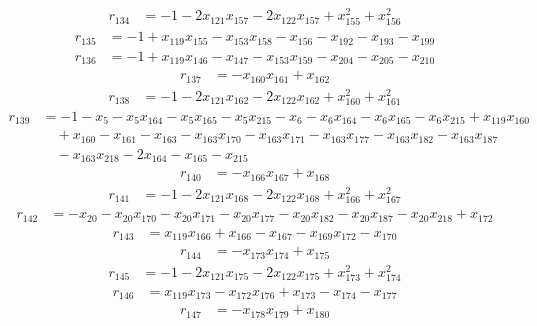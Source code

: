 \begin{align*}
r_{134}&=
-1-2x_{121}x_{157}-2x_{122}x_{157}+x_{155}^{2}+x_{156}^{2}
\end{align*}
\begin{align*}
r_{135}&=
-1+x_{119}x_{155}-x_{153}x_{158}-x_{156}-x_{192}-x_{193}-x_{199}
\end{align*}
\begin{align*}
r_{136}&=
-1+x_{119}x_{146}-x_{147}-x_{153}x_{159}-x_{204}-x_{205}-x_{210}
\end{align*}
\begin{align*}
r_{137}&=
-x_{160}x_{161}+x_{162}
\end{align*}
\begin{align*}
r_{138}&=
-1-2x_{121}x_{162}-2x_{122}x_{162}+x_{160}^{2}+x_{161}^{2}
\end{align*}
\begin{align*}
r_{139}&=
-1-x_{5}-x_{5}x_{164}-x_{5}x_{165}-x_{5}x_{215}-x_{6}-x_{6}x_{164}-x_{6}x_{165}-x_{6}x_{215}+x_{119}x_{160} \\
&\quad +x_{160}-x_{161}-x_{163}-x_{163}x_{170}-x_{163}x_{171}-x_{163}x_{177}-x_{163}x_{182}-x_{163}x_{187} \\
&\quad -x_{163}x_{218}-2x_{164}-x_{165}-x_{215}
\end{align*}
\begin{align*}
r_{140}&=
-x_{166}x_{167}+x_{168}
\end{align*}
\begin{align*}
r_{141}&=
-1-2x_{121}x_{168}-2x_{122}x_{168}+x_{166}^{2}+x_{167}^{2}
\end{align*}
\begin{align*}
r_{142}&=
-x_{20}-x_{20}x_{170}-x_{20}x_{171}-x_{20}x_{177}-x_{20}x_{182}-x_{20}x_{187}-x_{20}x_{218}+x_{172}
\end{align*}
\begin{align*}
r_{143}&=
x_{119}x_{166}+x_{166}-x_{167}-x_{169}x_{172}-x_{170}
\end{align*}
\begin{align*}
r_{144}&=
-x_{173}x_{174}+x_{175}
\end{align*}
\begin{align*}
r_{145}&=
-1-2x_{121}x_{175}-2x_{122}x_{175}+x_{173}^{2}+x_{174}^{2}
\end{align*}
\begin{align*}
r_{146}&=
x_{119}x_{173}-x_{172}x_{176}+x_{173}-x_{174}-x_{177}
\end{align*}
\begin{align*}
r_{147}&=
-x_{178}x_{179}+x_{180}
\end{align*}
